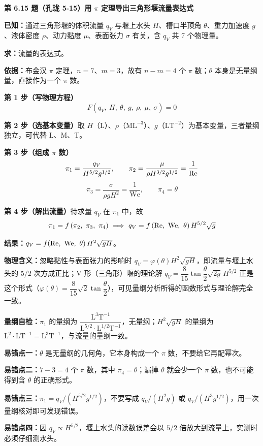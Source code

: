 \noindent\textbf{第 6.15 题（孔珑 5-15）\quad 用 $\pi$ 定理导出三角形堰流量表达式}

\begin{jie}
\textbf{已知：}通过三角形堰的体积流量 $q_V$ 与堰上水头 $H$、槽口半顶角 $\theta$、重力加速度 $g$、液体密度 $\rho$、动力黏度 $\mu$、表面张力 $\sigma$ 有关，含 $q_V$ 共 7 个物理量。

\textbf{求：}流量的表达式。

\textbf{依据：}布金汉 $\pi$ 定理，$n=7$、$m=3$，故有 $n-m=4$ 个 $\pi$ 数；$\theta$ 本身是无量纲量，直接作为一个 $\pi$ 数。

\textbf{第 1 步（写物理方程）}\quad
\[F\left(q_V,\ H,\ \theta,\ g,\ \rho,\ \mu,\ \sigma\right)=0\]

\textbf{第 2 步（选基本变量）}\quad 取 $H$（$\mathrm{L}$）、$\rho$（$\mathrm{ML^{-3}}$）、$g$（$\mathrm{LT^{-2}}$）为基本变量，三者量纲独立，可代替 L、M、T。

\textbf{第 3 步（组成 $\pi$ 数）}\quad
\[\pi_1=\frac{q_V}{H^{5/2}g^{1/2}},\qquad \pi_2=\frac{\mu}{\rho H^{3/2}g^{1/2}}=\frac{1}{\mathrm{Re}}\]
\[\pi_3=\frac{\sigma}{\rho gH^{2}}=\frac{1}{\mathrm{We}},\qquad \pi_4=\theta\]

\textbf{第 4 步（解出流量）}\quad 待求量 $q_V$ 在 $\pi_1$ 中，故
\[\pi_1=f\left(\pi_2,\ \pi_3,\ \pi_4\right)\ \Longrightarrow\ q_V=f\left(\Rey,\ \mathrm{We},\ \theta\right)H^{5/2}\sqrt{g}\]

\textbf{结果：}$q_V=f\!\left(\Rey,\ \mathrm{We},\ \theta\right)H^{2}\sqrt{gH}$。

\textbf{物理含义：}忽略黏性与表面张力的影响时 $q_V=\varphi(\theta)H^{2}\sqrt{gH}$，即流量与堰上水头的 $5/2$ 次方成正比；V 形（三角形）堰的理论解 $q_V=\dfrac{8}{15}\tan\dfrac{\theta}{2}\sqrt{2g}\,H^{5/2}$ 正是这个形式（$\varphi(\theta)=\dfrac{8}{15}\sqrt{2}\tan\dfrac{\theta}{2}$），可见量纲分析所得的函数形式与理论解完全一致。

\textbf{量纲自检：}$\pi_1$ 的量纲为 $\dfrac{\mathrm{L^{3}T^{-1}}}{\mathrm{L^{5/2}}\cdot\mathrm{L^{1/2}T^{-1}}}$，无量纲；$H^{2}\sqrt{gH}$ 的量纲为 $\mathrm{L^{2}}\cdot\mathrm{LT^{-1}}=\mathrm{L^{3}T^{-1}}$，与流量的量纲一致。
\end{jie}

\begin{yicuo}
\textbf{易错点一：}$\theta$ 是无量纲的几何角，它本身构成一个 $\pi$ 数，不要给它再配幂次。

\textbf{易错点二：}$7-3=4$ 个 $\pi$ 数，其中 $\pi_4=\theta$；漏掉 $\theta$ 就会少一个 $\pi$ 数，也不可能得到含 $\theta$ 的正确形式。

\textbf{易错点三：}$\pi_1=q_V/(H^{5/2}g^{1/2})$，不要写成 $q_V/(H^{2}g)$ 或 $q_V/(H^{3}g^{1/2})$，用一次量纲核对即可发现错误。

\textbf{易错点四：}因 $q_V\propto H^{5/2}$，堰上水头的读数误差会以 $5/2$ 倍放大到流量上，实测时必须仔细测水头。
\end{yicuo}

